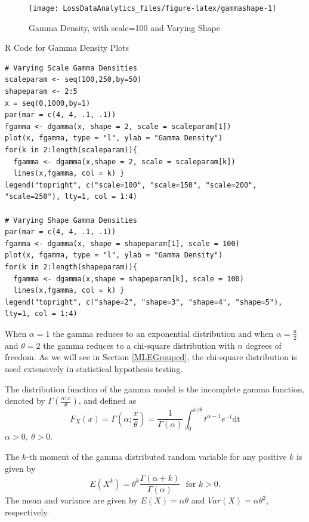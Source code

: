 \documentclass[]{book}
\theoremstyle{definition}
\theoremstyle{definition}
\theoremstyle{definition}
\theoremstyle{remark}
\begin{document}
\begin{figure}

{\centering \texttt{[image: LossDataAnalytics\_files/figure-latex/gammashape-1]} 

}

\caption{Gamma Density, with scale=100 and Varying Shape}\label{fig:gammashape}
\end{figure}

R Code for Gamma Density Plots

\hypertarget{display.gammascale.2}{}
\begin{verbatim}
# Varying Scale Gamma Densities
scaleparam <- seq(100,250,by=50)
shapeparam <- 2:5
x = seq(0,1000,by=1)
par(mar = c(4, 4, .1, .1))
fgamma <- dgamma(x, shape = 2, scale = scaleparam[1])
plot(x, fgamma, type = "l", ylab = "Gamma Density")
for(k in 2:length(scaleparam)){
  fgamma <- dgamma(x,shape = 2, scale = scaleparam[k])
  lines(x,fgamma, col = k) }
legend("topright", c("scale=100", "scale=150", "scale=200", "scale=250"), lty=1, col = 1:4)

# Varying Shape Gamma Densities
par(mar = c(4, 4, .1, .1))
fgamma <- dgamma(x, shape = shapeparam[1], scale = 100)
plot(x, fgamma, type = "l", ylab = "Gamma Density")
for(k in 2:length(shapeparam)){
  fgamma <- dgamma(x,shape = shapeparam[k], scale = 100)
  lines(x,fgamma, col = k) }
legend("topright", c("shape=2", "shape=3", "shape=4", "shape=5"), lty=1, col = 1:4)
\end{verbatim}

When \(\alpha = 1\) the gamma reduces to an exponential distribution and
when \(\alpha = \frac{n}{2}\) and \(\theta = 2\) the gamma reduces to a
chi-square distribution with \(n\) degrees of freedom. As we will see in
Section \ref{MLEGrouped}, the chi-square distribution is used
extensively in statistical hypothesis testing.

The distribution function of the gamma model is the incomplete gamma
function, denoted by \(\Gamma\left( \frac{\alpha;x}{\theta} \right)\),
and defined as
\[F_{X}\left( x \right) = \Gamma\left( \alpha; \frac{x}{\theta} \right) = \frac{1}{\Gamma\left( \alpha \right)}\int_{0}^{x /\theta}t^{\alpha - 1}e^{- t}\text{dt}\]
\(\alpha > 0,\ \theta > 0\).

The \(k\)-th moment of the gamma distributed random variable for any
positive \(k\) is given by
\[E\left( X^{k} \right) = \theta^{k} \frac{\Gamma\left( \alpha + k \right)}{\Gamma\left( \alpha \right)}  \ \ \ \text{for } k > 0 .\]
The mean and variance are given by \(E\left( X \right) = \alpha\theta\)
and \(Var\left( X \right) = \alpha\theta^{2}\), respectively.
\end{document}
